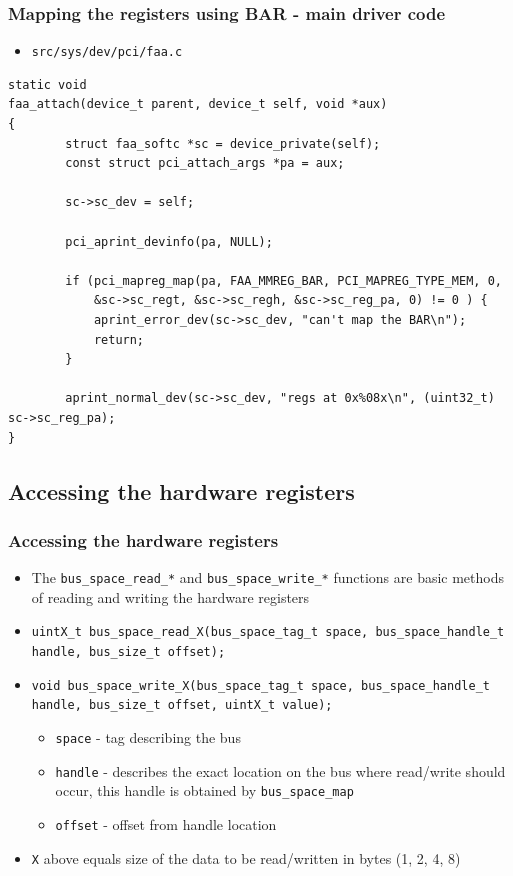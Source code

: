 \documentclass[dvipsnames,table]{beamer}
\begin{document}
\begin{frame}[fragile]
\frametitle{Mapping the registers using BAR - main driver code}
\scriptsize
\begin{itemize}
	\item {\tt src/sys/dev/pci/faa.c}
\end{itemize}
\begin{lstlisting}
static void
faa_attach(device_t parent, device_t self, void *aux)
{
        struct faa_softc *sc = device_private(self);
        const struct pci_attach_args *pa = aux;

        sc->sc_dev = self;

        pci_aprint_devinfo(pa, NULL);

        if (pci_mapreg_map(pa, FAA_MMREG_BAR, PCI_MAPREG_TYPE_MEM, 0, 
            &sc->sc_regt, &sc->sc_regh, &sc->sc_reg_pa, 0) != 0 ) {
            aprint_error_dev(sc->sc_dev, "can't map the BAR\n");
            return;
        }

        aprint_normal_dev(sc->sc_dev, "regs at 0x%08x\n", (uint32_t) sc->sc_reg_pa);
}
\end{lstlisting}
\end{frame}

\subsection{Accessing the hardware registers}

\begin{frame}
\frametitle{Accessing the hardware registers}
\begin{itemize}
	\item The {\tt bus\_space\_read\_*} and {\tt bus\_space\_write\_*} functions are basic methods of reading and writing the hardware registers
	\item {\tt uintX\_t bus\_space\_read\_X(bus\_space\_tag\_t space, bus\_space\_handle\_t handle, bus\_size\_t offset);}
	\item {\tt void bus\_space\_write\_X(bus\_space\_tag\_t space, bus\_space\_handle\_t handle, bus\_size\_t offset, uintX\_t value);}
	\begin{itemize}
		\item {\tt space} - tag describing the bus
		\item {\tt handle} - describes the exact location on the bus where read/write should occur, this handle is obtained by {\tt bus\_space\_map}
		\item {\tt offset} - offset from handle location
	\end{itemize}
	\item {\tt X} above equals size of the data to be read/written in bytes (1, 2, 4, 8)
\end{itemize}
\end{frame}
\end{document}
